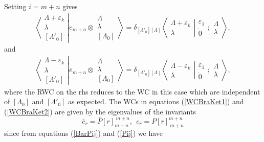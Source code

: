 \documentclass[12pt]{article}
\begin{document}
Setting $i=m+n$ gives
\begin{align}
\left\langle\left. 
\begin{array}{c} \Lambda+\varepsilon_k\\ \lambda \\ {[\Lambda'_0]} \end{array}
\right|\right.
\left.
e_{m+n} \otimes \begin{array}{c} \Lambda \\ \lambda \\
{[\Lambda_0]} \end{array}
\right\rangle = \delta_{[\Lambda'_0][\Lambda]}
 \left\langle\left. 
\begin{array}{c} \Lambda+\varepsilon_k\\ \lambda \end{array}
\right|\right.
\left.
\begin{array}{c} 
\varepsilon_1 \\ \dot{0}
\end{array}
;
\begin{array}{c} \Lambda \\ 
\lambda \end{array}
\right\rangle  , \label{WCBraKet1}
\end{align}
and
\begin{align}
\left\langle\left. 
\begin{array}{c} \Lambda-\varepsilon_k\\ \lambda \\ {[\Lambda'_0]} \end{array}
\right|\right.
\left.
\bar{e}_{m+n} \otimes \begin{array}{c} \Lambda \\ \lambda \\
{[\Lambda_0]} \end{array}
\right\rangle = \delta_{[\Lambda'_0][\Lambda]}
 \left\langle\left. 
\begin{array}{c} \Lambda-\varepsilon_k\\ \lambda \end{array}
\right|\right.
\left.
\begin{array}{c} 
\bar{\varepsilon}_1 \\ \dot{0}
\end{array}
;
\begin{array}{c} \Lambda \\
\lambda \end{array}
\right\rangle  , \label{WCBraKet2}
\end{align}
where the RWC on the rhs reduces to the WC in this case which are independent of $[\Lambda_0]$ and $[\Lambda'_0]$ as expected. 
The WCs in equations (\ref{WCBraKet1}) and (\ref{WCBraKet2}) are given by the eigenvalues of the invariants
$$ 
\bar{c}_r = \bar{P}[r]_{m+n}^{\ m+n}, ~~c_r = P[r]_{\ m+n}^{m+n}
$$
since from equations (\ref{BarPij}) and (\ref{Pij}) we have
\end{document}
